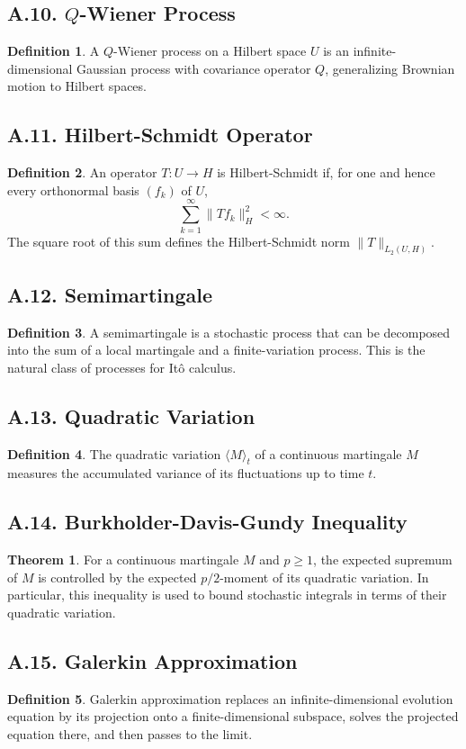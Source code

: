 \documentclass[11pt]{article}
\theoremstyle{definition}
\newtheorem{definition}{Definition}
\newtheorem{theorem}{Theorem}
\theoremstyle{remark}
\begin{document}
\subsection*{A.10. \(Q\)-Wiener Process}
\begin{definition}
A \(Q\)-Wiener process on a Hilbert space \(U\) is an infinite-dimensional Gaussian process with covariance operator \(Q\), generalizing Brownian motion to Hilbert spaces.
\end{definition}

\subsection*{A.11. Hilbert-Schmidt Operator}
\begin{definition}
An operator \(T:U\to H\) is Hilbert-Schmidt if, for one and hence every orthonormal basis \((f_k)\) of \(U\),
\[
\sum_{k=1}^\infty \|Tf_k\|_H^2<\infty.
\]
The square root of this sum defines the Hilbert-Schmidt norm \(\|T\|_{L_2(U,H)}\).
\end{definition}

\subsection*{A.12. Semimartingale}
\begin{definition}
A semimartingale is a stochastic process that can be decomposed into the sum of a local martingale and a finite-variation process. This is the natural class of processes for It\^o calculus.
\end{definition}

\subsection*{A.13. Quadratic Variation}
\begin{definition}
The quadratic variation \(\langle M\rangle_t\) of a continuous martingale \(M\) measures the accumulated variance of its fluctuations up to time \(t\).
\end{definition}

\subsection*{A.14. Burkholder-Davis-Gundy Inequality}
\begin{theorem}
For a continuous martingale \(M\) and \(p\ge 1\), the expected supremum of \(M\) is controlled by the expected \(p/2\)-moment of its quadratic variation. In particular, this inequality is used to bound stochastic integrals in terms of their quadratic variation.
\end{theorem}

\subsection*{A.15. Galerkin Approximation}
\begin{definition}
Galerkin approximation replaces an infinite-dimensional evolution equation by its projection onto a finite-dimensional subspace, solves the projected equation there, and then passes to the limit.
\end{definition}
\end{document}
